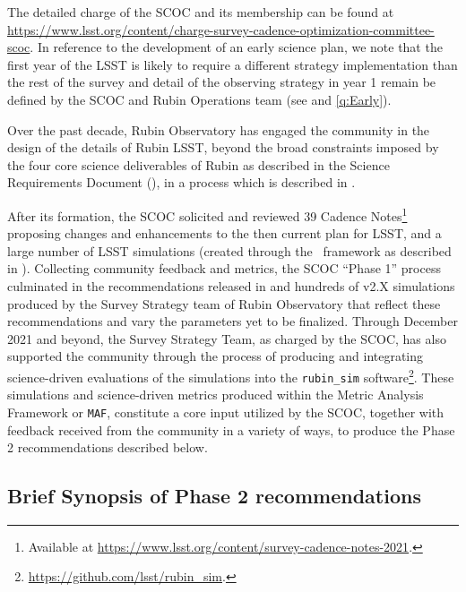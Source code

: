 The detailed charge of the SCOC and its membership can be found at \url{https://www.lsst.org/content/charge-survey-cadence-optimization-committee-scoc}. In reference to the development of an early science plan, we note that the first year of the LSST is likely to require a different strategy implementation than the rest of the survey and detail of the observing strategy in year 1 remain be defined by the SCOC and Rubin Operations team (see  and \autoref{q:Early}).

Over the past decade, Rubin Observatory has engaged the community in the design of the details of Rubin LSST, beyond the broad constraints imposed by the four core science deliverables of Rubin as described in the Science Requirements Document (), in a process which is described in \citet{2022ApJS..258....1B}.

After its formation, the SCOC solicited %
and reviewed 39 Cadence Notes\footnote{\label{fn:cnotes}Available at \url{https://www.lsst.org/content/survey-cadence-notes-2021}.} proposing changes and enhancements to the then current plan for LSST, and a large number of LSST simulations (created through the \opsim\ framework as described in ). Collecting community feedback and metrics, the SCOC ``Phase 1'' process culminated in the recommendations released in  and hundreds of v2.X simulations produced by the Survey Strategy team of Rubin Observatory that reflect these recommendations and vary the parameters yet to be finalized.
Through December 2021 and beyond, the Survey Strategy Team, as charged by the SCOC, has also supported the community through the process of producing and integrating science-driven evaluations of the simulations into the \texttt{rubin\_sim} software\footnote{\url{https://github.com/lsst/rubin_sim}.}. These simulations and science-driven metrics produced within the Metric Analysis Framework \citep{2014SPIE.9149E..0BJ} or \texttt{MAF},  constitute a core input utilized by the SCOC, together with feedback received from the community in a variety of ways, to produce the Phase 2 recommendations described below.


\subsection{Brief Synopsis of Phase 2 recommendations}\label{sec:shortrec}


